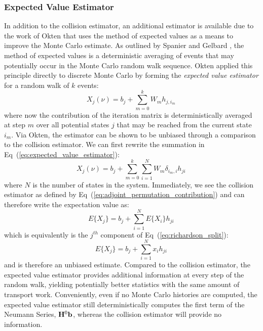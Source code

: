 \subsubsection{Expected Value Estimator}
\label{subsec:expected_value_estimator}
In addition to the collision estimator, an additional estimator is
available due to the work of Okten \cite{okten_solving_2005} that
uses the method of expected values as a means to improve the Monte
Carlo estimate. As outlined by Spanier and Gelbard
\cite{spanier_monte_1969}, the method of expected values is a
deterministic averaging of events that may potentially occur in the
Monte Carlo random walk sequence. Okten applied this principle
directly to discrete Monte Carlo by forming the \textit{expected value
  estimator} for a random walk of $k$ events:
\begin{equation}
  X_{j}(\nu) = b_j + \sum_{m=0}^k W_m h_{j,i_m}\,
  \label{eq:expected_value_estimator}
\end{equation}
where now the contribution of the iteration matrix is
deterministically averaged at step $m$ over all potential states $j$
that may be reached from the current state $i_m$. Via Okten, the
estimator can be shown to be unbiased through a comparison to the
collision estimator. We can first rewrite the summation in
Eq~(\ref{eq:expected_value_estimator}):
\begin{equation}
  X_{j}(\nu) = b_j + \sum_{m=0}^k \sum_{i=1}^N W_m
  \delta_{i_m,i} h_{ji}\,
  \label{eq:unbiased_eval_1}
\end{equation}
where $N$ is the number of states in the system. Immediately, we see
the collision estimator as defined by
Eq~(\ref{eq:adjoint_permutation_contribution}) and can therefore write
the expectation value as:
\begin{equation}
  E\{X_{j}\} = b_j + \sum_{i=1}^N E\{X_{i}\} h_{ji}\,
  \label{eq:unbiased_eval_2}
\end{equation}
which is equivalently is the $j^{th}$ component of
Eq~(\ref{eq:richardson_split}):
\begin{equation}
  E\{X_{j}\} = b_j + \sum_{i=1}^N x_{i} h_{ji}\,
  \label{eq:unbiased_eval_2}
\end{equation}
and is therefore an unbiased estimate. Compared to the collision
estimator, the expected value estimator provides additional
information at every step of the random walk, yielding potentially
better statistics with the same amount of transport
work. Conveniently, even if no Monte Carlo histories are computed, the
expected value estimator still deterministically computes the first
term of the Neumann Series, $\mathbf{H}^0\mathbf{b}$, whereas the collision
estimator will provide no information.

